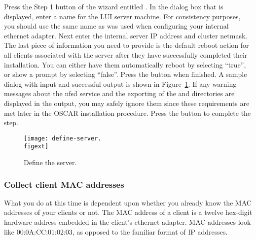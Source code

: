Press the Step 1 button of the wizard entitled . In the dialog box that is displayed, enter a name for the
LUI server machine. For consistency purposes, you should use the same
name as was used when configuring your internal ethernet adapter. Next
enter the internal server IP address and cluster netmask. The last
piece of information you need to provide is the default reboot action
for all clients associated with the server after they have
successfully completed their installation. You can either have them
automatically reboot by selecting ``true'', or show a prompt by
selecting ``false''.  Press the  button
when finished.  A sample dialog with input and successful output is
shown in Figure~\ref{fig:detailed-define-server}. If any warning
messages about the nfsd service and the exporting of the 
and  directories are displayed in the output, you may
safely ignore them since these requirements are met later in the OSCAR
installation procedure. Press the  button to complete
the step.

\begin{figure}[htbp]
  \begin{center}
    \texttt{[image: define-server.\\figext]}
    \caption{Define the server.}
    \label{fig:detailed-define-server}
  \end{center}
\end{figure}
  
\subsubsection{Collect client MAC addresses} 

What you do at this time is dependent upon whether you already know
the MAC addresses of your clients or not. The MAC address of a client
is a twelve hex-digit hardware address embedded in the client's
ethernet adapter. MAC addresses look like 00:0A:CC:01:02:03, as
opposed to the familiar format of IP addresses.

